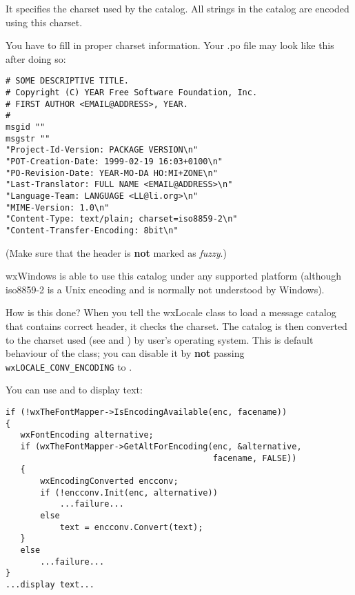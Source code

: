 It specifies the charset used by the catalog. All strings in the catalog
are encoded using this charset.

You have to fill in proper charset information. Your .po file may look like this
after doing so: 

\begin{verbatim}
# SOME DESCRIPTIVE TITLE.
# Copyright (C) YEAR Free Software Foundation, Inc.
# FIRST AUTHOR <EMAIL@ADDRESS>, YEAR.
#
msgid ""
msgstr ""
"Project-Id-Version: PACKAGE VERSION\n"
"POT-Creation-Date: 1999-02-19 16:03+0100\n"
"PO-Revision-Date: YEAR-MO-DA HO:MI+ZONE\n"
"Last-Translator: FULL NAME <EMAIL@ADDRESS>\n"
"Language-Team: LANGUAGE <LL@li.org>\n"
"MIME-Version: 1.0\n"
"Content-Type: text/plain; charset=iso8859-2\n"
"Content-Transfer-Encoding: 8bit\n"
\end{verbatim}

(Make sure that the header is {\bf not} marked as {\it fuzzy}.)

wxWindows is able to use this catalog under any supported platform
(although iso8859-2 is a Unix encoding and is normally not understood by
Windows).

How is this done? When you tell the wxLocale class to load a message catalog that
contains correct header, it checks the charset. The catalog is then converted
to the charset used (see
 and
) by
user's operating system. This is default behaviour of the
 class; you can disable it by {\bf not} passing
{\tt wxLOCALE\_CONV\_ENCODING} to .


You can use  and 
 to display text:

\begin{verbatim}
if (!wxTheFontMapper->IsEncodingAvailable(enc, facename))
{
   wxFontEncoding alternative;
   if (wxTheFontMapper->GetAltForEncoding(enc, &alternative, 
                                          facename, FALSE))
   {
       wxEncodingConverted encconv;
       if (!encconv.Init(enc, alternative))
           ...failure...
       else
           text = encconv.Convert(text);
   }
   else
       ...failure...
}
...display text...
\end{verbatim}


